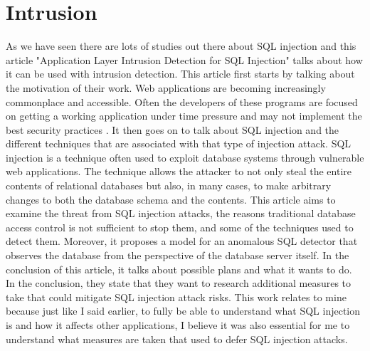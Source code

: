\section{Intrusion}
\label{sec:Intrustion}

As we have seen there are lots of studies out there about SQL injection and this article "Application Layer Intrusion Detection for SQL Injection" talks about how it can be used with intrusion detection. This article first starts by talking about the motivation of their work. Web applications are becoming increasingly commonplace and accessible. Often the developers of these programs are focused on getting a working application under time pressure and may not implement the best security practices \cite{rietta2006application}.
It then goes on to talk about SQL injection and the different techniques that are associated with that type of injection attack. SQL injection is a technique often used to exploit database systems through vulnerable web applications. The technique allows the attacker to not only steal the entire contents of relational databases but also, in many cases, to make arbitrary changes to both the database schema and the contents. This article aims to examine the threat from SQL injection attacks, the reasons traditional database access control is not sufficient to stop them, and some of the techniques used to detect them. Moreover, it proposes a model for an anomalous SQL detector that observes the database from the perspective of the database server itself. In the conclusion of this article, it talks about possible plans and what it wants to do. In the conclusion, they state that they want to research additional measures to take that could mitigate SQL injection attack risks. This work relates to mine because just like I said earlier, to fully be able to understand what SQL injection is and how it affects other applications, I believe it was also essential for me to understand what measures are taken that used to defer SQL injection attacks.

